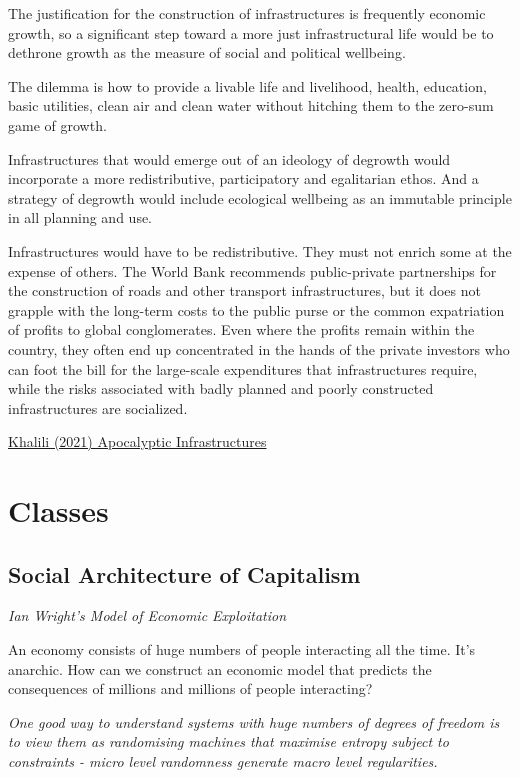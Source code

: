 \documentclass[
]{book}
\begin{document}
The justification for the construction of infrastructures is frequently economic growth, so a significant step toward a more just infrastructural life would be to dethrone growth as the measure of social and political wellbeing.

The dilemma is how to provide a livable life and livelihood, health, education, basic utilities, clean air and clean water without hitching them to the zero-sum game of growth.

Infrastructures that would emerge out of an ideology of degrowth would incorporate a more redistributive, participatory and egalitarian ethos. And a strategy of degrowth would include ecological wellbeing as an immutable principle in all planning and use.

Infrastructures would have to be redistributive. They must not enrich some at the expense of others. The World Bank recommends public-private partnerships for the construction of roads and other transport infrastructures, but it does not grapple with the long-term costs to the public purse or the common expatriation of profits to global conglomerates. Even where the profits remain within the country, they often end up concentrated in the hands of the private investors who can foot the bill for the large-scale expenditures that infrastructures require, while the risks associated with badly planned and poorly constructed infrastructures are socialized.

\href{https://www.noemamag.com/apocalyptic-infrastructures/}{Khalili (2021) Apocalyptic Infrastructures}

\hypertarget{classes}{%
\chapter{Classes}\label{classes}}

\hypertarget{social-architecture-of-capitalism}{%
\section{Social Architecture of Capitalism}\label{social-architecture-of-capitalism}}

\emph{Ian Wright's Model of Economic Exploitation}

An economy consists of huge numbers of people interacting all the time.
It's anarchic.
How can we construct an economic model that predicts
the consequences of millions and millions of people interacting?

\emph{One good way to understand systems with huge numbers of degrees of freedom is to view them as randomising machines that maximise entropy subject to constraints -
micro level randomness generate macro level regularities.}
\end{document}
